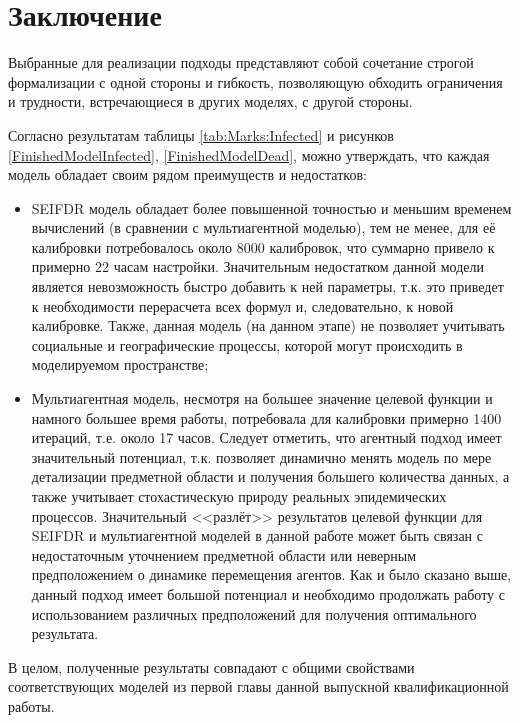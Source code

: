 \newpage
\parindent=1cm %
\section*{Заключение} %

Выбранные для реализации подходы представляют собой сочетание строгой формализации с одной стороны и гибкость, позволяющую обходить ограничения и трудности, встречающиеся в других моделях, с другой стороны. 

Согласно результатам таблицы \ref{tab:Marks:Infected} и рисунков \ref{FinishedModelInfected}, \ref{FinishedModelDead}, можно утверждать, что каждая модель обладает своим рядом преимуществ и недостатков: 
\begin{itemize}
	\item SEIFDR модель обладает более повышенной точностью и меньшим временем вычислений (в сравнении с мультиагентной моделью), тем не менее, для её калибровки потребовалось около 8000 калибровок, что суммарно привело к  примерно 22 часам настройки. Значительным недостатком данной модели является невозможность быстро добавить к ней параметры, т.к. это приведет к необходимости перерасчета всех формул и, следовательно, к новой калибровке. Также, данная модель (на данном этапе) не позволяет учитывать социальные и географические процессы, которой могут происходить в моделируемом пространстве;
	\item Мультиагентная модель, несмотря на большее значение целевой функции и намного большее время работы, потребовала для калибровки примерно 1400 итераций, т.е. около 17 часов. Следует отметить, что агентный подход имеет значительный потенциал, т.к. позволяет динамично менять модель по мере детализации предметной области и получения большего количества данных, а также учитывает стохастическую природу реальных эпидемических процессов. Значительный <<разлёт>> результатов целевой функции для SEIFDR и мультиагентной моделей в данной работе может быть связан с недостаточным уточнением предметной области или неверным предположением о динамике перемещения агентов. Как и было сказано выше, данный подход имеет большой потенциал и необходимо продолжать работу с использованием различных предположений для получения оптимального результата.
\end{itemize}
В целом, полученные результаты совпадают с общими свойствами соответствующих моделей из первой главы данной выпускной квалификационной работы.


